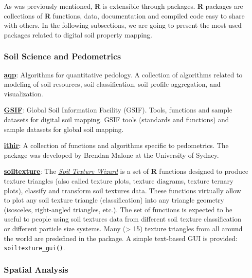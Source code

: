 \documentclass[10pt,b5paper,]{book}
\theoremstyle{definition}
\theoremstyle{definition}
\theoremstyle{definition}
\theoremstyle{remark}
\begin{document}
As was previously mentioned, \textbf{R} is extensible through packages.
\textbf{R} packages are collections of \textbf{R} functions, data,
documentation and compiled code easy to share with others. In the
following subsections, we are going to present the most used packages
related to digital soil property mapping.

\hypertarget{SoilPedometrics}{%
\subsubsection{Soil Science and Pedometrics}\label{SoilPedometrics}}

\href{https://CRAN.R-project.org/package=aqp}{\textbf{aqp}}: Algorithms
for quantitative pedology. A collection of algorithms related to
modeling of soil resources, soil classification, soil profile
aggregation, and visualization.

\href{https://CRAN.R-project.org/package=GSIF}{\textbf{GSIF}}: Global
Soil Information Facility (GSIF). Tools, functions and sample datasets
for digital soil mapping. GSIF tools (standards and functions) and
sample datasets for global soil mapping.

\href{http://ithir.r-forge.r-project.org/}{\textbf{ithir}}: A collection
of functions and algorithms specific to pedometrics. The package was
developed by Brendan Malone at the University of Sydney.

\href{https://CRAN.R-project.org/package=soiltexture}{\textbf{soiltexture}}:
The
\href{https://cran.r-project.org/web/packages/soiltexture/vignettes/soiltexture_vignette.pdf}{\emph{Soil
Texture Wizard}} is a set of \textbf{R} functions designed to produce
texture triangles (also called texture plots, texture diagrams, texture
ternary plots), classify and transform soil textures data. These
functions virtually allow to plot any soil texture triangle
(classification) into any triangle geometry (isosceles, right-angled
triangles, etc.). The set of functions is expected to be useful to
people using soil textures data from different soil texture
classification or different particle size systems. Many (\textgreater{}
15) texture triangles from all around the world are predefined in the
package. A simple text-based GUI is provided:
\texttt{soiltexture\_gui()}.

\hypertarget{spatial-analysis}{%
\subsubsection{Spatial Analysis}\label{spatial-analysis}}
\end{document}
